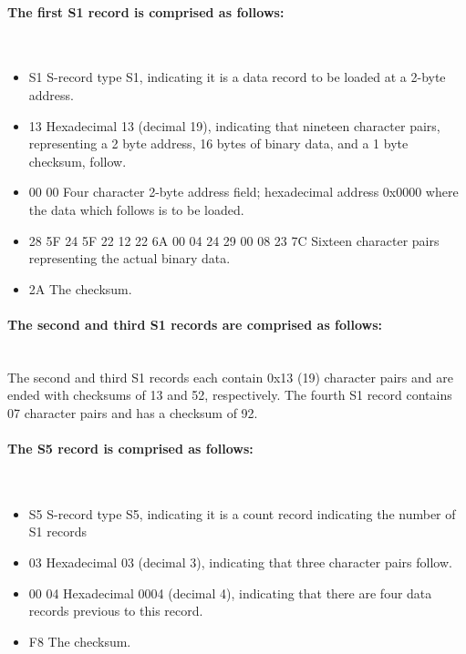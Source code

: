             \paragraph{The first S1 record is comprised as follows:}
                ~\\
                \begin{itemize}
                    \item S1 S-record type S1, indicating it is a data record to be loaded at a 2-byte address.
                    \item 13 Hexadecimal 13 (decimal 19), indicating that nineteen character pairs, representing a 2 byte address, 16 bytes of binary data, and a 1 byte checksum, follow.
                    \item 00 00 Four character 2-byte address field; hexadecimal address 0x0000 where the data which follows is to be loaded.
                    \item 28 5F 24 5F 22 12 22 6A 00 04 24 29 00 08 23 7C Sixteen character pairs representing the actual binary data.
                    \item 2A The checksum.
                \end{itemize}

            \paragraph{The second and third S1 records are comprised as follows:}
                ~\\
                The second and third S1 records each contain 0x13 (19) character pairs and are ended with checksums of 13 and 52, respectively. The fourth S1 record contains 07 character pairs and has a checksum of 92.

            \paragraph{The S5 record is comprised as follows:}
                ~\\
                \begin{itemize}
                    \item S5 S-record type S5, indicating it is a count record indicating the number of S1 records
                    \item 03 Hexadecimal 03 (decimal 3), indicating that three character pairs follow.
                    \item 00 04 Hexadecimal 0004 (decimal 4), indicating that there are four data records previous to this record.
                    \item F8 The checksum.
                \end{itemize}

